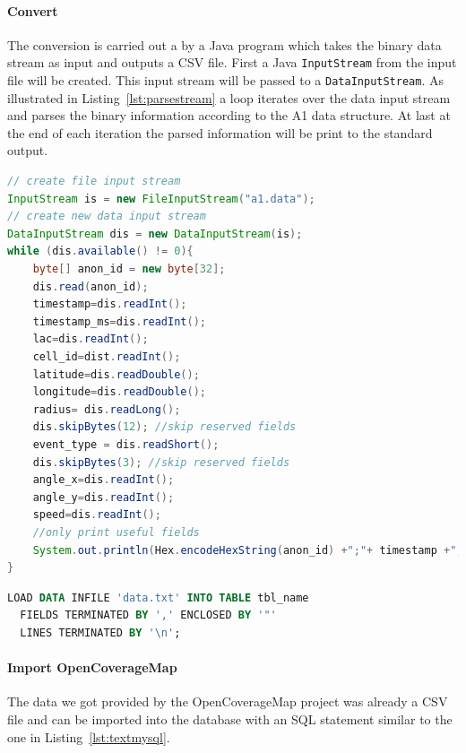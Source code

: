 \documentclass[master,english]{hgbthesis}
\begin{document}
\paragraph{Convert}
The conversion is carried out a by a Java program which takes the binary data stream as input and outputs a CSV file. First a Java \verb|InputStream| from the input file will be created. This input stream will be passed to a \verb|DataInputStream|. As illustrated in Listing~\ref{lst:parsestream} a loop iterates over the data input stream and parses the binary information according to the A1 data structure. At last at the end of each iteration the parsed information will be print to the standard output.
\begin{lstlisting}[language=Java,style=JAVA,caption={Example code to parse event data stream},label={lst:parsestream}]
// create file input stream
InputStream is = new FileInputStream("a1.data");
// create new data input stream
DataInputStream dis = new DataInputStream(is);
while (dis.available() != 0){
    byte[] anon_id = new byte[32];
    dis.read(anon_id);
    timestamp=dis.readInt();
    timestamp_ms=dis.readInt();
    lac=dis.readInt();
    cell_id=dist.readInt();
    latitude=dis.readDouble();
    longitude=dis.readDouble();
    radius= dis.readLong();
    dis.skipBytes(12); //skip reserved fields
    event_type = dis.readShort();
    dis.skipBytes(3); //skip reserved fields
    angle_x=dis.readInt();
    angle_y=dis.readInt();
    speed=dis.readInt();
    //only print useful fields
    System.out.println(Hex.encodeHexString(anon_id) +";"+ timestamp +";"+lac +";"+cell_id +";"+latitude +";"+longitude +";"+event_type +";"+angle_x);
}
\end{lstlisting}
\begin{lstlisting}[style=htmlcssjs,language=SQL,caption={Load text file into MySQL database},label={lst:textmysql}]
LOAD DATA INFILE 'data.txt' INTO TABLE tbl_name
  FIELDS TERMINATED BY ',' ENCLOSED BY '"'
  LINES TERMINATED BY '\n';
\end{lstlisting}
\paragraph{Import OpenCoverageMap}
The data we got provided by the OpenCoverageMap project was already a CSV file and can be imported into the database with an SQL statement similar to the one in Listing~\ref{lst:textmysql}.
\end{document}
